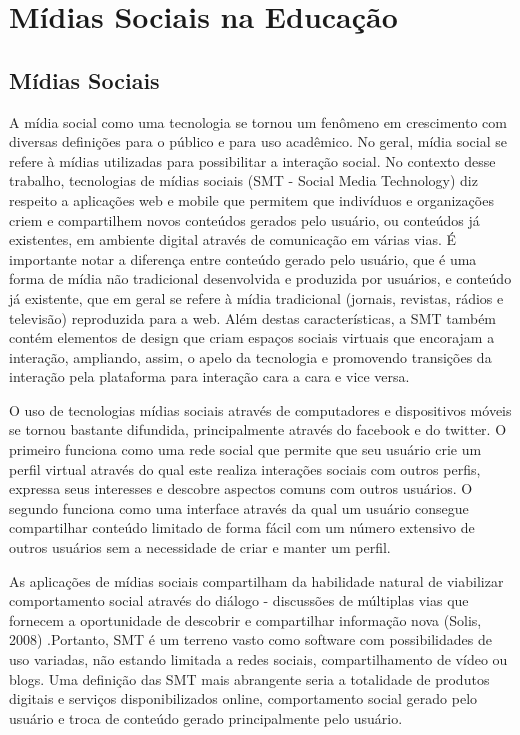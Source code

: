 \chapter{Mídias Sociais na Educação}
\label{cap:midias-sociais}

\section{Mídias Sociais}

A mídia social como uma tecnologia se tornou um fenômeno em crescimento com
diversas definições para o público e para uso acadêmico. No geral, mídia social
se refere à mídias utilizadas para possibilitar a interação social. No contexto
desse trabalho, tecnologias de mídias sociais (SMT - Social Media Technology)
diz respeito a aplicações web e mobile que permitem que indivíduos e organizações
criem e compartilhem novos conteúdos gerados pelo usuário, ou conteúdos já
existentes, em ambiente digital através de comunicação em várias vias. É
importante notar a diferença entre conteúdo gerado pelo usuário, que é uma forma
de mídia não tradicional desenvolvida e produzida por usuários, e conteúdo já
existente, que em geral se refere à mídia tradicional (jornais, revistas, rádios
e televisão) reproduzida para a web. Além destas características, a SMT também
contém elementos de design que criam espaços sociais virtuais que encorajam a 
interação, ampliando, assim, o apelo da tecnologia e promovendo transições da 
interação pela plataforma para interação cara a cara e vice versa.

O uso de tecnologias mídias sociais através de computadores e dispositivos móveis
se tornou bastante difundida, principalmente através do facebook e do twitter.
O primeiro funciona como uma rede social que permite que seu usuário crie um 
perfil virtual através do qual este realiza interações sociais com outros perfis,
expressa seus interesses e descobre aspectos comuns com outros usuários. O segundo
funciona como uma interface através da qual um usuário consegue compartilhar
conteúdo limitado de forma fácil com um número extensivo de outros usuários sem
a necessidade de criar e manter um perfil.

As aplicações de mídias sociais compartilham da habilidade natural de viabilizar
comportamento social através do diálogo - discussões de múltiplas vias que
fornecem a oportunidade de descobrir e compartilhar informação nova (Solis, 2008)
.Portanto, SMT é um terreno vasto como software com
possibilidades de uso variadas, não estando limitada a redes sociais,
compartilhamento de vídeo ou blogs. Uma definição das SMT mais abrangente seria
a totalidade de produtos digitais e serviços disponibilizados online,
comportamento social gerado pelo usuário e troca de conteúdo gerado principalmente
pelo usuário.

